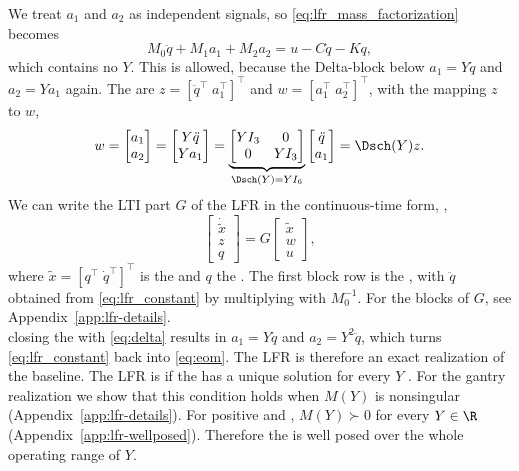We treat $a_1$ and $a_2$ as independent signals, so \eqref{eq:lfr_mass_factorization}
becomes
\begin{equation}
  M_0\ddot q+M_1a_1+M_2a_2=u-C\dot q-Kq,
  \label{eq:lfr_constant}
\end{equation}
which contains no $Y$.
This is allowed, because the Delta-block below 
$a_1=Y\ddot q$ and $a_2=Ya_1$ again.
The  are $z=[\ddot q^\top\;a_1^\top]^\top$ and $w=[a_1^\top\;a_2^\top]^\top$,
with the  mapping $z$ to $w$,
\begin{equation}
  w=\begin{bmatrix}a_1\\a_2\end{bmatrix}
   =\begin{bmatrix}Y\ddot q\\Ya_1\end{bmatrix}
   =\underbrace{\begin{bmatrix}YI_3&0\\0&YI_3\end{bmatrix}}_{\Dsch(Y)=YI_6}
    \begin{bmatrix}\ddot q\\a_1\end{bmatrix}
   =\Dsch(Y)z.
  \label{eq:delta}
\end{equation}
We can write the LTI part $G$ of the LFR in the continuous-time form,
\cite[Eq.~(6)]{drenth2025lpvlfr},
\begin{equation}
  \begin{bmatrix}\dot{\tilde x}\\ z\\ q\end{bmatrix}
  =G\begin{bmatrix}\tilde x\\ w\\ u\end{bmatrix},
  \label{eq:lfr_G}
\end{equation}
where $\tilde x=[q^\top\;\dot q^\top]^\top$ is the  and $q$ the .
The first block row is the , with $\ddot q$ obtained from
\eqref{eq:lfr_constant} by multiplying with $M_0^{-1}$. For the blocks of $G$, see Appendix~\ref{app:lfr-details}.
\\
 closing the  with \eqref{eq:delta} results in
$a_1=Y\ddot q$ and $a_2=Y^2\ddot q$, which turns \eqref{eq:lfr_constant} back
into \eqref{eq:eom}. The LFR is therefore an exact realization of the baseline.
The LFR is  if the  has a unique solution for
every $Y$ \cite[Def.~1]{drenth2025lpvlfr}. 
For the gantry realization we show that this condition holds
when $M(Y)$ is nonsingular (Appendix~\ref{app:lfr-details}).
For positive  and , $M(Y)\succ0$ for every $Y\in\R$
(Appendix~\ref{app:lfr-wellposed}). Therefore the  is well posed over the
whole operating range of $Y$. 

